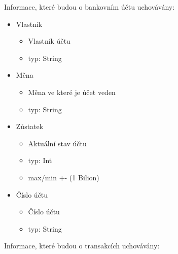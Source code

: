 \documentclass[FM,SP]{tulthesis}
\begin{document}
Informace, které budou o bankovním účtu uchovávány:
\begin{itemize}
    \item Vlastník
          \begin{itemize}
              \item Vlastník účtu
              \item typ: String
          \end{itemize}
    \item Měna
          \begin{itemize}
              \item Měna ve které je účet veden
              \item typ: String
          \end{itemize}
          \clearpage %
    \item Zůstatek
          \begin{itemize}
              \item Aktuální stav účtu
              \item typ: Int
              \item max/min +- (1 Bilion)
          \end{itemize}
    \item Číslo účtu
          \begin{itemize}
              \item Číslo účtu
              \item typ: String
          \end{itemize}
\end{itemize}
Informace, které budou o transakcích uchovávány:
\end{document}
